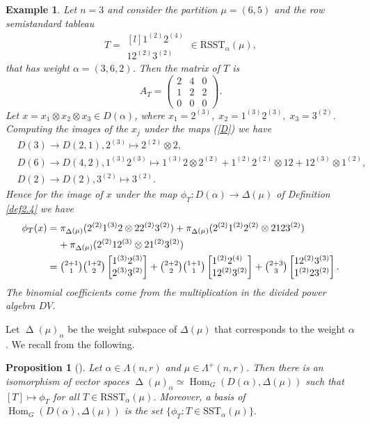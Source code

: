 \documentclass[11pt]{article}
\newtheorem*{exam*}{Example}
\newtheorem{prop}[theo]{Proposition}
\theoremstyle{definition}
\numberwithin{equation}{section}
\newcommand{\al}{\alpha}
\DeclareMathOperator{\Hom}{Hom}
\DeclareMathOperator{\D}{\mathrm{\Delta}}
\numberwithin{equation}{section}
\begin{document}
\begin{exam*}
	Let $n=3$ and consider the partition $\mu=(6,5)$ and the row semistandard tableau \[ T=\begin{matrix*}[l]
		1^{(2)} 2^{(4)} \\
		12^{(2)}3^{(2)}  \end{matrix*} \in \mathrm{RSST}_{\al}(\mu), \] 
that has weight $\alpha=(3,6,2)$. Then the matrix of $T$ is \[A_T=\begin{pmatrix*}
	2& 4& 0 \\ 1& 2& 2 \\ 0& 0& 0
 \end{pmatrix*}.\]Let $x=x_1 \otimes x_2 \otimes x_3 \in D(\alpha)$, where $x_1=2^{(3)}, \; x_2= 1^{(3)}2^{(3)}, \;  x_3=3^{(2)}.$
Computing the images of the $x_j$ under the maps (\ref{D}) we have \begin{align*}
	&D(3) \to D(2,1), 2^{(3)} \mapsto 2^{(2)} \otimes 2,\\&
	D(6) \to D(4,2), 1^{(3)}2^{(3)} \mapsto 1^{(3)}2 \otimes 2^{(2)} +1^{(2)}2^{(2)} \otimes 12 + 12^{(3)} \otimes 1^{(2)},\\&
	D(2) \to D(2), 3^{(2)} \mapsto 3^{(2)}.
\end{align*} Hence for the image of $x$ under the map $\phi_T: D(\alpha) \to \Delta(\mu)$ of Definition \ref{def2.4} we have \begin{align*}
\phi_T(x)&={\pi}_{\D(\mu)}(2^{(2)}1^{(3)}2 \otimes 2 2^{(2)}  3^{(2)}) + {\pi}_{\D(\mu)}(2^{(2)} 1^{(2)}2^{(2)}\otimes 2 12 3^{(2)}) \\& \; \; \;  \; +{\pi}_{\D(\mu)}(2^{(2)} 12^{(3)}\otimes 2 1^{(2)} 3^{(2)}) \\&= \tbinom{2+1}{1} \tbinom{1+2}{2}	\begin{bmatrix*}[l]
	1^{(3)}2^{(3)}  \\
	2^{(3)} 3^{(2)}
\end{bmatrix*} +\tbinom{2+2}{2} \tbinom{1+1}{1}	\begin{bmatrix*}[l]
1^{(2)}2^{(4)}  \\
12^{(2)} 3^{(2)}
\end{bmatrix*} + \tbinom{2+3}{3}	\begin{bmatrix*}[l]
12^{(2)}3^{(3)}  \\
1^{(2)}2 3^{(2)}
\end{bmatrix*}.
\end{align*}
The binomial coefficients come from the multiplication in the divided power algebra $DV$.	
\end{exam*}
Let $\D(\mu)_{\al}$ be the weight subspace of $\Delta(\mu)$ that corresponds to the weight $\al$. We recall from \cite[Section 2]{AB} the following.
\begin{prop}[\cite{AB}] Let $\al \in \Lambda(n,r)$ and $\mu \in \Lambda^+(n,r)$. Then there is an isomorphism of vector spaces $\D(\mu)_{\al} \simeq \Hom_G(D(\al), \Delta(\mu))$ such that $[T] \mapsto \phi_T$ for all $T \in \mathrm{RSST}_{\al}(\mu)$. Moreover, a basis of $\Hom_G(D(\al), \Delta(\mu))$ is the set $\{\phi_T: T \in \mathrm{SST}_{\al}(\mu)\}.$
\end{prop}
\end{document}
